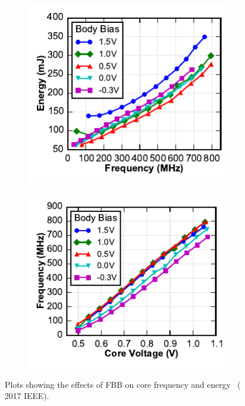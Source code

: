 \documentclass[graybox]{svmult}
\begin{document}
\begin{figure}
  \centering
  \hspace*{\fill}
  \begin{subfigure}[t]{0.4\textwidth}
  \centering
  \includegraphics[width=\textwidth]{6-raven4-shmoo-a}
  \caption{}
  \label{fig:6-raven4-shmoo-a}
  \end{subfigure}
  \hspace*{\fill}
  \begin{subfigure}[t]{0.4\textwidth}
  \centering
  \includegraphics[width=\textwidth]{6-raven4-shmoo-b}
  \caption{}
  \label{fig:6-raven4-shmoo-b}
  \end{subfigure}
  \hspace*{\fill}
  \caption{Plots showing the effects of FBB on core frequency and energy~\cite{Keller2017} ({\textcopyright} 2017 IEEE).}
  \label{fig:6-raven4-shmoo}
\end{figure}
\end{document}
